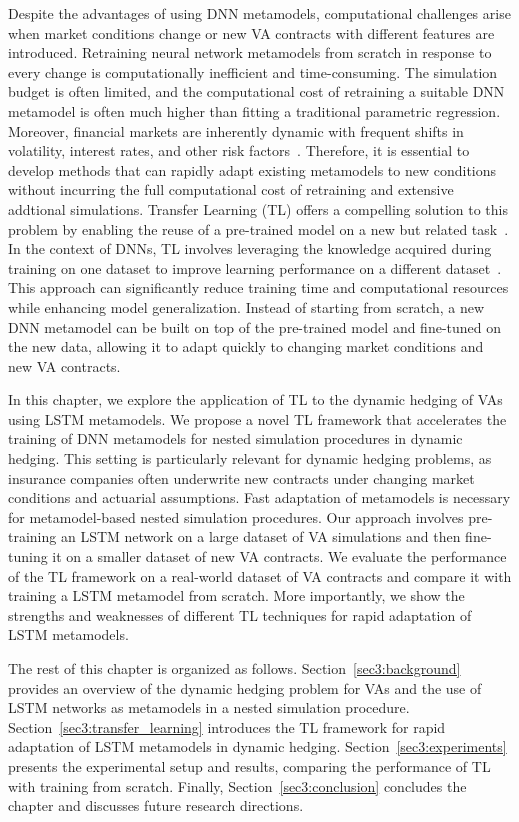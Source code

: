 Despite the advantages of using DNN metamodels, computational challenges arise when market conditions change or new VA contracts with different features are introduced. 
Retraining neural network metamodels from scratch in response to every change is computationally inefficient and time-consuming.
The simulation budget is often limited, and the computational cost of retraining a suitable DNN metamodel is often much higher than fitting a traditional parametric regression.
Moreover, financial markets are inherently dynamic with frequent shifts in volatility, interest rates, and other risk factors~\citep{cont2001empirical}.
Therefore, it is essential to develop methods that can rapidly adapt existing metamodels to new conditions without incurring the full computational cost of retraining and extensive addtional simulations.
Transfer Learning (TL) offers a compelling solution to this problem by enabling the reuse of a pre-trained model on a new but related task~\citep{pan2009survey}.
In the context of DNNs, TL involves leveraging the knowledge acquired during training on one dataset to improve learning performance on a different dataset~\citep{yosinski2014transferable}.
This approach can significantly reduce training time and computational resources while enhancing model generalization.
Instead of starting from scratch, a new DNN metamodel can be built on top of the pre-trained model and fine-tuned on the new data, allowing it to adapt quickly to changing market conditions and new VA contracts.

In this chapter, we explore the application of TL to the dynamic hedging of VAs using LSTM metamodels.
We propose a novel TL framework that accelerates the training of DNN metamodels for nested simulation procedures in dynamic hedging.
This setting is particularly relevant for dynamic hedging problems, as insurance companies often underwrite new contracts under changing market conditions and actuarial assumptions.
Fast adaptation of metamodels is necessary for metamodel-based nested simulation procedures.
Our approach involves pre-training an LSTM network on a large dataset of VA simulations and then fine-tuning it on a smaller dataset of new VA contracts.
We evaluate the performance of the TL framework on a real-world dataset of VA contracts and compare it with training a LSTM metamodel from scratch.
More importantly, we show the strengths and weaknesses of different TL techniques for rapid adaptation of LSTM metamodels.

The rest of this chapter is organized as follows.
Section~\ref{sec3:background} provides an overview of the dynamic hedging problem for VAs and the use of LSTM networks as metamodels in a nested simulation procedure.
Section~\ref{sec3:transfer_learning} introduces the TL framework for rapid adaptation of LSTM metamodels in dynamic hedging.
Section~\ref{sec3:experiments} presents the experimental setup and results, comparing the performance of TL with training from scratch.
Finally, Section~\ref{sec3:conclusion} concludes the chapter and discusses future research directions.

